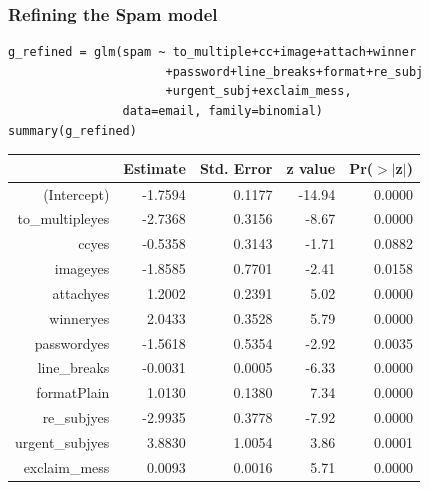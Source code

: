 \begin{frame}[fragile]
\frametitle{Refining the Spam model}

\vspace{-5mm}

{\footnotesize
\begin{verbatim}
g_refined = glm(spam ~ to_multiple+cc+image+attach+winner
                      +password+line_breaks+format+re_subj
                      +urgent_subj+exclaim_mess, 
                data=email, family=binomial)
summary(g_refined)
\end{verbatim}

\begin{center}
\begin{tabular}{rrrrr}
  \hline
 & Estimate & Std. Error & z value & Pr($>$$|$z$|$) \\ 
  \hline
(Intercept) & -1.7594 & 0.1177 & -14.94 & 0.0000 \\ 
  to\_multipleyes & -2.7368 & 0.3156 & -8.67 & 0.0000 \\ 
  ccyes & -0.5358 & 0.3143 & -1.71 & 0.0882 \\ 
  imageyes & -1.8585 & 0.7701 & -2.41 & 0.0158 \\ 
  attachyes & 1.2002 & 0.2391 & 5.02 & 0.0000 \\ 
  winneryes & 2.0433 & 0.3528 & 5.79 & 0.0000 \\ 
  passwordyes & -1.5618 & 0.5354 & -2.92 & 0.0035 \\ 
  line\_breaks & -0.0031 & 0.0005 & -6.33 & 0.0000 \\ 
  formatPlain & 1.0130 & 0.1380 & 7.34 & 0.0000 \\ 
  re\_subjyes & -2.9935 & 0.3778 & -7.92 & 0.0000 \\ 
  urgent\_subjyes & 3.8830 & 1.0054 & 3.86 & 0.0001 \\ 
  exclaim\_mess & 0.0093 & 0.0016 & 5.71 & 0.0000 \\ 
   \hline
\end{tabular}
\end{center}

}
\end{frame}


